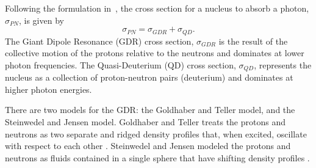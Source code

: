     Following the formulation in~\cite{emPCite4}, the cross section for a
      nucleus to absorb a photon, $\sigma_{PN}$, is given by 
      \begin{equation}
        \sigma_{PN}=\sigma_{GDR}+\sigma_{QD}.
        \label{eq:photoNucDis}
      \end{equation}
    The Giant Dipole Resonance (GDR) cross section, $\sigma_{GDR}$ is the result
      of the collective motion of the protons relative to the neutrons and 
      dominates at lower photon frequencies.
    The Quasi-Deuterium (QD) cross section, $\sigma_{QD}$, represents the 
      nucleus as a collection of proton-neutron pairs (deuterium) and dominates 
      at higher photon energies.

    There are two models for the GDR: the Goldhaber and Teller model, and the 
      Steinwedel and Jensen model.
    Goldhaber and Teller treats the protons and neutrons as two separate and 
      ridged density profiles that, when excited, oscillate with respect to 
      each other \cite{emPCite6}.
    Steinwedel and Jensen modeled the protons and neutrons as fluids contained 
      in a single sphere that have shifting density profiles \cite{emPCite6}.

